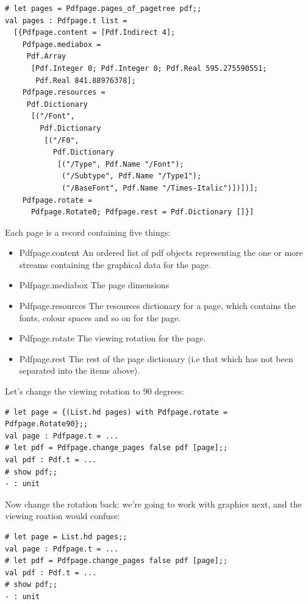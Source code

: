 \documentclass[a4paper]{memoir}
\begin{document}
\begin{framed}
\small\begin{verbatim}
# let pages = Pdfpage.pages_of_pagetree pdf;;
val pages : Pdfpage.t list =
  [{Pdfpage.content = [Pdf.Indirect 4];
    Pdfpage.mediabox =
     Pdf.Array
      [Pdf.Integer 0; Pdf.Integer 0; Pdf.Real 595.275590551;
       Pdf.Real 841.88976378];
    Pdfpage.resources =
     Pdf.Dictionary
      [("/Font",
        Pdf.Dictionary
         [("/F0",
           Pdf.Dictionary
            [("/Type", Pdf.Name "/Font");
             ("/Subtype", Pdf.Name "/Type1");
             ("/BaseFont", Pdf.Name "/Times-Italic")])])];
    Pdfpage.rotate =
      Pdfpage.Rotate0; Pdfpage.rest = Pdf.Dictionary []}]
\end{verbatim}
\end{framed}
\noindent Each page is a record containing five things:
\begin{itemize}
\item \textsf{Pdfpage.content} An ordered list of pdf objects representing the one or more streams containing the graphical data for the page.
\item \textsf{Pdfpage.mediabox} The page dimensions
\item \textsf{Pdfpage.resources} The resources dictionary for a page, which contains the fonts, colour spaces and so on for the page.
\item \textsf{Pdfpage.rotate} The viewing rotation for the page.
\item \textsf{Pdfpage.rest} The rest of the page dictionary (i.e that which has not been separated into the items above).
\end{itemize}
Let's change the viewing rotation to 90 degrees:
\begin{framed}
\small\begin{verbatim}
# let page = {(List.hd pages) with Pdfpage.rotate = Pdfpage.Rotate90};;
val page : Pdfpage.t = ...
# let pdf = Pdfpage.change_pages false pdf [page];;
val pdf : Pdf.t = ...
# show pdf;;
- : unit
\end{verbatim}
\end{framed}
\noindent Now change the rotation back: we're going to work with graphics next, and the viewing roation would confuse:
\begin{framed}
\small\begin{verbatim}
# let page = List.hd pages;;
val page : Pdfpage.t = ...
# let pdf = Pdfpage.change_pages false pdf [page];;
val pdf : Pdf.t = ...
# show pdf;;
- : unit
\end{verbatim}
\end{framed}
\end{document}
